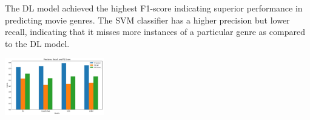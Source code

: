 \documentclass[hbrs-poster.tex]{subfiles}
\begin{document}
    {
    The DL model achieved the highest F1-score indicating superior performance in predicting movie genres. The SVM classifier has a higher precision but lower recall, indicating that it misses more instances of a particular genre as compared to the DL model.
        \begin{tikzfigure}
                \includegraphics[width=0.325\textwidth, height=0.111\textheight]{figures/results.jpg}
            \end{tikzfigure}
    }
\end{document}
